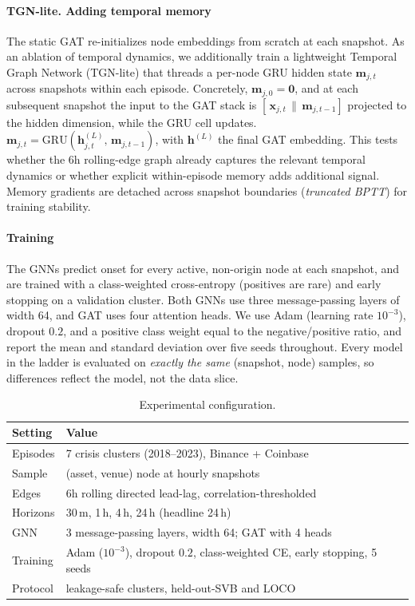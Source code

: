 \documentclass[sigconf,anonymous]{acmart}
\begin{document}
\paragraph{TGN-lite. Adding temporal memory} The static GAT re-initializes node embeddings from
scratch at each snapshot. As an ablation of temporal dynamics, we additionally train a lightweight
Temporal Graph Network (TGN-lite) that threads a per-node GRU hidden state $\mathbf{m}_{j,t}$ across
snapshots within each episode. Concretely, $\mathbf{m}_{j,0}=\mathbf{0}$, and at each subsequent
snapshot the input to the GAT stack is $[\,\mathbf{x}_{j,t}\,\|\,\mathbf{m}_{j,t-1}]$ projected to
the hidden dimension, while the GRU cell updates.
$\mathbf{m}_{j,t}=\mathrm{GRU}(\mathbf{h}_{j,t}^{(L)},\,\mathbf{m}_{j,t-1})$, with
$\mathbf{h}^{(L)}$ the final GAT embedding. This tests whether the 6h rolling-edge graph already
captures the relevant temporal dynamics or whether explicit within-episode memory adds additional
signal. Memory gradients are detached across snapshot boundaries (\emph{truncated BPTT}) for
training stability.

\paragraph{Training} The GNNs predict onset for every active, non-origin node at each snapshot, and
are trained with a class-weighted cross-entropy (positives are rare) and early stopping on a
validation cluster. Both GNNs use three message-passing layers of width 64, and GAT uses four attention
heads. We use Adam (learning rate $10^{-3}$), dropout $0.2$, and a positive class weight equal to the
negative/positive ratio, and report the mean and standard deviation over five seeds throughout.
Every model in the ladder is evaluated on \emph{exactly the same} (snapshot, node)
samples, so differences reflect the model, not the data slice.

\begin{table}[t]
\centering
\caption{Experimental configuration.}
\label{tab:config}
\small
\begin{tabular}{@{}l p{}@{}}
\toprule
Setting & Value \\
\midrule
Episodes & 7 crisis clusters (2018--2023), Binance + Coinbase \\
Sample & (asset, venue) node at hourly snapshots \\
Edges & 6h rolling directed lead-lag, correlation-thresholded \\
Horizons & 30\,m, 1\,h, 4\,h, 24\,h (headline 24\,h) \\
GNN & 3 message-passing layers, width 64; GAT with 4 heads \\
Training & Adam ($10^{-3}$), dropout $0.2$, class-weighted CE, early stopping, 5 seeds \\
Protocol & leakage-safe clusters, held-out-SVB and LOCO \\
\bottomrule
\end{tabular}
\end{table}
\end{document}
